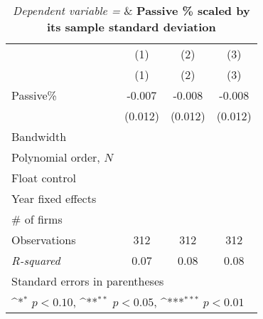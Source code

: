 \begin{table}[htbp]\centering
\def\sym#1{\ifmmode^{#1}\else\(^{#1}\)\fi}
\caption{\textit{Dependent variable =} & \textbf{Passive \% scaled by its sample standard deviation}}
\begin{tabular}{l*{3}{c}}
\toprule
                    &\multicolumn{1}{c}{(1)}&\multicolumn{1}{c}{(2)}&\multicolumn{1}{c}{(3)}\\
                    &\multicolumn{1}{c}{(1)}&\multicolumn{1}{c}{(2)}&\multicolumn{1}{c}{(3)}\\
\midrule
Passive\%           &      -0.007         &      -0.008         &      -0.008         \\
                    &     (0.012)         &     (0.012)         &     (0.012)         \\
\midrule
Bandwidth           &                     &                     &                     \\
Polynomial order, \(N\)&                     &                     &                     \\
Float control       &                     &                     &                     \\
Year fixed effects  &                     &                     &                     \\
# of firms          &                     &                     &                     \\
Observations        &         312         &         312         &         312         \\
\textit{R-squared}  &        0.07         &        0.08         &        0.08         \\
\bottomrule
\multicolumn{4}{l}{\footnotesize Standard errors in parentheses}\\
\multicolumn{4}{l}{\footnotesize \sym{*} \(p<0.10\), \sym{**} \(p<0.05\), \sym{***} \(p<0.01\)}\\
\end{tabular}
\end{table}
